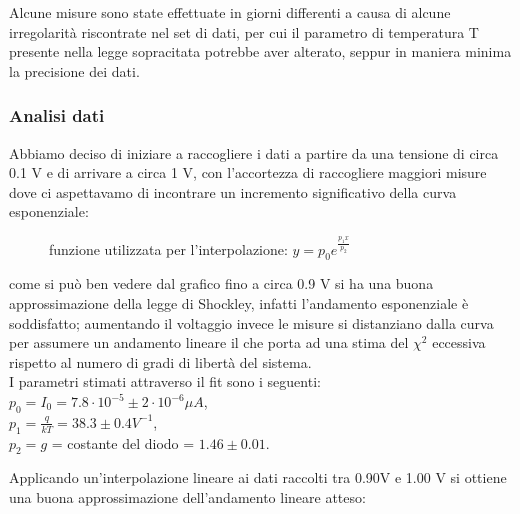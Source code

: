 \documentclass[a4paper]{article}
\theoremstyle{definition}
\begin{document}
\noindent Alcune misure sono state effettuate in giorni differenti a causa di alcune irregolarità riscontrate nel set di dati, per cui il parametro di temperatura T presente nella legge sopracitata potrebbe aver alterato, seppur in maniera minima la precisione dei dati. 
\subsubsection*{Analisi dati}

Abbiamo deciso di iniziare a raccogliere i dati a partire da una tensione di circa 0.1 V e di arrivare a circa 1 V, con l'accortezza di raccogliere maggiori misure dove ci aspettavamo di incontrare un incremento significativo della curva esponenziale:\\

\begin{figure}[!ht]

	\caption{funzione utilizzata per l'interpolazione: \(y = p_{0} e^{\frac{p_{1}x}{p_{2}} }\)}
	\label{fig:intensita_su_voltaggio}

\end{figure}
\noindent come si può ben vedere dal grafico fino a circa 0.9 V si ha una buona approssimazione della legge di Shockley, infatti l'andamento esponenziale è soddisfatto; aumentando il voltaggio invece le misure si distanziano dalla curva per assumere un andamento lineare il che porta ad una stima del \(\chi^{2}\) eccessiva rispetto al numero di gradi di libertà del sistema.\\

\noindent I parametri stimati attraverso il fit sono i seguenti:\\
\( p_{0} = I_{0} = 7.8 \cdot 10^{-5} \pm 2 \cdot 10^{-6} \mu A\),\\
\(p_{1} = \frac{q}{kT} = 38.3 \pm 0.4 V^{-1}\),\\
\( p_{2} = g\) = costante del diodo =  \(1.46 \pm  0.01\).

\pagebreak

\noindent Applicando un'interpolazione lineare ai dati raccolti tra 0.90V e 1.00 V si ottiene una buona approssimazione dell'andamento lineare atteso:\\
\end{document}
